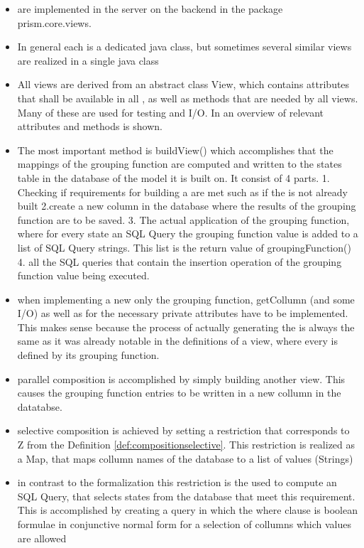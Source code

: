 \documentclass[preview]{standalone}
\begin{document}
\begin{itemize}
	\item \viewsN are implemented in the server on the backend in the package prism.core.views.
	\item In general each \viewN is a dedicated java class, but sometimes several similar views are realized in a single java class
	\item All views are derived from an abstract class View, which contains attributes that shall be available in all \viewsN, as well as methods that are needed by all views. Many of these are used for testing and I/O. In  an overview of relevant attributes and methods is shown.	
	\item The most important method is buildView() which accomplishes that the mappings of the grouping function are computed and written to the states table in the database of the model it is built on. It consist of 4 parts. 1. Checking if requirements for building a \viewN are met such as if the \viewN is not already built 2.create a new column in the database where the results of the grouping function are to be saved. 3. The actual application of the grouping function, where for every state an SQL Query the grouping function value is added to a list of SQL Query strings. This list is the return value of groupingFunction() 4. all the SQL queries that contain the insertion operation of the grouping function value being executed.
	\item when implementing a new \viewN only the grouping function, getCollumn (and some I/O) as well as for the \viewN necessary private attributes have to be implemented. This makes sense because the process of actually generating the \viewN is always the same as it was already notable in the definitions of a view, where every \viewN is defined by its grouping function.
	\item parallel composition is accomplished by simply building another view. This causes the grouping function entries to be written in a new collumn in the datatabse.
	\item selective composition is achieved by setting a restriction that corresponds to Z from the Definition \ref{def:compositionselective}. This restriction is realized as a Map, that maps collumn names of the database to a list of values (Strings)
	\item in contrast to the formalization this restriction is the used to compute an SQL Query, that selects states from the database that meet this requirement. This is accomplished by creating a query in which the where clause is boolean formulae in conjunctive normal form for a selection of collumns which values are allowed

\end{itemize}
\end{document}
